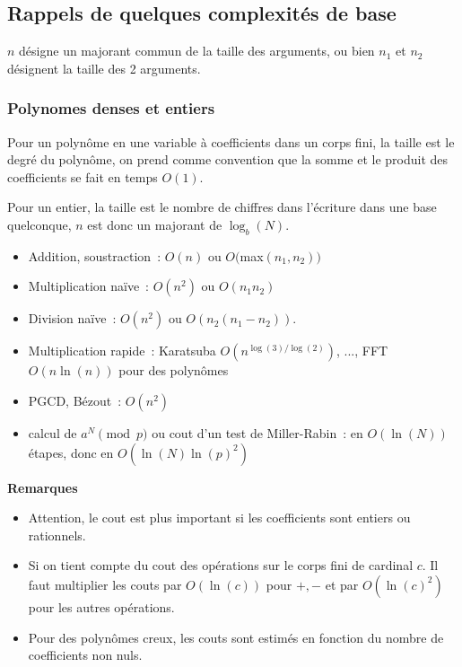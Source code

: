 \documentclass[a4paper,11pt]{article}
\begin{document}
\begin{giacjshere}
\pagebreak

\subsection{Rappels de quelques complexit\'es de base}
$n$ d\'esigne un majorant commun de la taille des arguments, ou bien
$n_1$ et $n_2$ d\'esignent la taille des 2 arguments.

\subsubsection{Polynomes denses et entiers}
Pour un polyn\^ome en une variable
\`a coefficients dans un corps fini, la taille est
le degr\'e du polyn\^ome, on prend comme convention que
la somme et le produit des coefficients se fait en temps $O(1)$.

Pour un entier, la taille est le nombre de chiffres dans l'\'ecriture
dans une base quelconque, $n$ est donc un majorant de $\log_b(N)$.
\begin{itemize}
\item Addition, soustraction~: $O(n)$ ou $O($max$(n_1,n_2))$
\item Multiplication na\"ive~: $O(n^2)$ ou $O(n_1n_2)$
\item Division na\"ive~: $O(n^2)$ ou $O(n_2(n_1-n_2))$.
\item Multiplication rapide~: Karatsuba $O(n^{\log(3)/\log(2)})$, ..., FFT
$O(n\ln(n))$ pour des polyn\^omes
\item PGCD, B\'ezout~: $O(n^2)$
\item calcul de $a^N \pmod p$ ou cout d'un test de Miller-Rabin~: 
en $O(\ln(N))$ \'etapes, donc en $O(\ln(N)\ln(p)^2)$
\end{itemize}

{\bf Remarques}
\begin{itemize}
\item Attention, le cout est plus important si les coefficients sont entiers
ou rationnels. 
\item Si on tient compte du cout des op\'erations sur le corps fini
de cardinal $c$. Il faut multiplier les couts par $O(\ln(c))$ pour $+,-$
et par $O(\ln(c)^2)$ pour les autres op\'erations.
\item Pour des polyn\^omes creux, les couts sont
estim\'es en fonction du nombre de coefficients non nuls.
\end{itemize}



\end{giacjshere}
\end{document}
